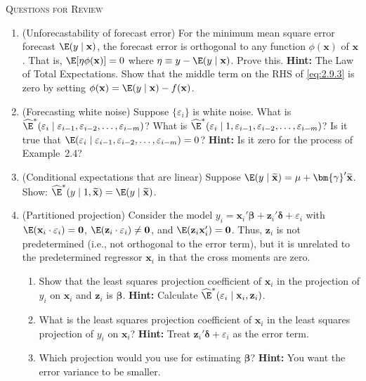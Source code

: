 \bigskip
\noindent\textsc{Questions for Review}
\begin{enumerate}
\item (Unforecastability of forecast error)\quad
For the minimum mean square error forecast $\E(y \mid \mathbf{x})$, the forecast error is orthogonal to any function $\phi(\mathbf{x})$ of $\mathbf{x}$. That is, $\E[\eta\phi(\mathbf{x})] = 0$ where
$\eta \equiv y - \E(y \mid \mathbf{x})$. Prove this.
\textbf{Hint:} The Law of Total Expectations. Show that the middle term on the RHS of \eqref{eq:2.9.3} is zero by setting $\phi(\mathbf{x}) = \E(y \mid \mathbf{x}) - f(\mathbf{x})$.

\item (Forecasting white noise)\quad
Suppose $\{\varepsilon_i\}$ is white noise. What is
$\widehat{\E}^*(\varepsilon_i \mid \varepsilon_{i-1}, \varepsilon_{i-2}, \ldots, \varepsilon_{i-m})$?
What is
$\widehat{\E}^*(\varepsilon_i \mid 1, \varepsilon_{i-1}, \varepsilon_{i-2}, \ldots, \varepsilon_{i-m})$?
Is it true that $\E(\varepsilon_i \mid \varepsilon_{i-1}, \varepsilon_{i-2}, \ldots, \varepsilon_{i-m}) = 0$?
\textbf{Hint:} Is it zero for the process of Example~2.4?

\item (Conditional expectations that are linear)\quad
Suppose $\E(y \mid \widetilde{\mathbf{x}}) = \mu + \bm{\gamma}'\widetilde{\mathbf{x}}$. Show:
$\widehat{\E}^*(y \mid 1, \widetilde{\mathbf{x}}) = \E(y \mid \widetilde{\mathbf{x}})$.

\item (Partitioned projection)\quad
Consider the model $y_i = \mathbf{x}_i'\bm{\beta} + \mathbf{z}_i'\bm{\delta} + \varepsilon_i$
with $\E(\mathbf{x}_i \cdot \varepsilon_i) = \mathbf{0}$, $\E(\mathbf{z}_i \cdot \varepsilon_i) \neq \mathbf{0}$, and
$\E(\mathbf{z}_i\mathbf{x}_i') = \mathbf{0}$. Thus, $\mathbf{z}_i$ is not predetermined (i.e., not orthogonal to the error term), but it is unrelated to the predetermined regressor $\mathbf{x}_i$ in that the cross moments are zero.
\begin{enumerate}[label=(\alph*)]
\item Show that the least squares projection coefficient of $\mathbf{x}_i$ in the projection of
$y_i$ on $\mathbf{x}_i$ and $\mathbf{z}_i$ is $\bm{\beta}$.
\textbf{Hint:} Calculate $\widehat{\E}^*(\varepsilon_i \mid \mathbf{x}_i, \mathbf{z}_i)$.
\item What is the least squares projection coefficient of $\mathbf{x}_i$ in the least squares
projection of $y_i$ on $\mathbf{x}_i$?
\textbf{Hint:} Treat $\mathbf{z}_i'\bm{\delta} + \varepsilon_i$ as the error term.
\item Which projection would you use for estimating $\bm{\beta}$?
\textbf{Hint:} You want the error variance to be smaller.
\end{enumerate}
\end{enumerate}
